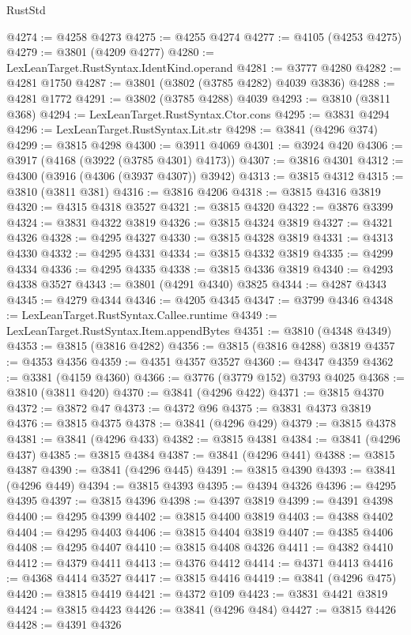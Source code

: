 \begin{lexlean}{RustStd}
\begin{coremodule}
@4274 := @4258 @4273
@4275 := @4255 @4274
@4277 := @4105 (@4253 @4275)
@4279 := @3801 (@4209 @4277)
@4280 := LexLeanTarget.RustSyntax.IdentKind.operand
@4281 := @3777 @4280
@4282 := @4281 @1750
@4287 := @3801 (@3802 (@3785 @4282) @4039 @3836)
@4288 := @4281 @1772
@4291 := @3802 (@3785 @4288) @4039
@4293 := @3810 (@3811 @368)
@4294 := LexLeanTarget.RustSyntax.Ctor.cons
@4295 := @3831 @4294
@4296 := LexLeanTarget.RustSyntax.Lit.str
@4298 := @3841 (@4296 @374)
@4299 := @3815 @4298
@4300 := @3911 @4069
@4301 := @3924 @420
@4306 := @3917 (@4168 (@3922 (@3785 @4301) @4173))
@4307 := @3816 @4301
@4312 := @4300 (@3916 (@4306 (@3937 @4307)) @3942)
@4313 := @3815 @4312
@4315 := @3810 (@3811 @381)
@4316 := @3816 @4206
@4318 := @3815 @4316 @3819
@4320 := @4315 @4318 @3527
@4321 := @3815 @4320
@4322 := @3876 @3399
@4324 := @3831 @4322 @3819
@4326 := @3815 @4324 @3819
@4327 := @4321 @4326
@4328 := @4295 @4327
@4330 := @3815 @4328 @3819
@4331 := @4313 @4330
@4332 := @4295 @4331
@4334 := @3815 @4332 @3819
@4335 := @4299 @4334
@4336 := @4295 @4335
@4338 := @3815 @4336 @3819
@4340 := @4293 @4338 @3527
@4343 := @3801 (@4291 @4340) @3825
@4344 := @4287 @4343
@4345 := @4279 @4344
@4346 := @4205 @4345
@4347 := @3799 @4346
@4348 := LexLeanTarget.RustSyntax.Callee.runtime
@4349 := LexLeanTarget.RustSyntax.Item.appendBytes
@4351 := @3810 (@4348 @4349)
@4353 := @3815 (@3816 @4282)
@4356 := @3815 (@3816 @4288) @3819
@4357 := @4353 @4356
@4359 := @4351 @4357 @3527
@4360 := @4347 @4359
@4362 := @3381 (@4159 @4360)
@4366 := @3776 (@3779 @152) @3793 @4025
@4368 := @3810 (@3811 @420)
@4370 := @3841 (@4296 @422)
@4371 := @3815 @4370
@4372 := @3872 @47
@4373 := @4372 @96
@4375 := @3831 @4373 @3819
@4376 := @3815 @4375
@4378 := @3841 (@4296 @429)
@4379 := @3815 @4378
@4381 := @3841 (@4296 @433)
@4382 := @3815 @4381
@4384 := @3841 (@4296 @437)
@4385 := @3815 @4384
@4387 := @3841 (@4296 @441)
@4388 := @3815 @4387
@4390 := @3841 (@4296 @445)
@4391 := @3815 @4390
@4393 := @3841 (@4296 @449)
@4394 := @3815 @4393
@4395 := @4394 @4326
@4396 := @4295 @4395
@4397 := @3815 @4396
@4398 := @4397 @3819
@4399 := @4391 @4398
@4400 := @4295 @4399
@4402 := @3815 @4400 @3819
@4403 := @4388 @4402
@4404 := @4295 @4403
@4406 := @3815 @4404 @3819
@4407 := @4385 @4406
@4408 := @4295 @4407
@4410 := @3815 @4408 @4326
@4411 := @4382 @4410
@4412 := @4379 @4411
@4413 := @4376 @4412
@4414 := @4371 @4413
@4416 := @4368 @4414 @3527
@4417 := @3815 @4416
@4419 := @3841 (@4296 @475)
@4420 := @3815 @4419
@4421 := @4372 @109
@4423 := @3831 @4421 @3819
@4424 := @3815 @4423
@4426 := @3841 (@4296 @484)
@4427 := @3815 @4426
@4428 := @4391 @4326

\end{coremodule}
\end{lexlean}
